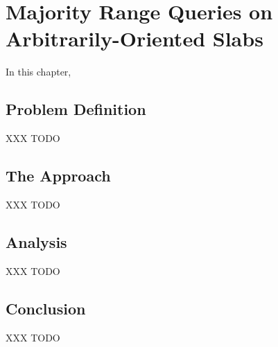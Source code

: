 \chapter{Majority Range Queries on Arbitrarily-Oriented Slabs}
\label{:slabs}

In this chapter, 


\section{Problem Definition}
\label{:slabs:problem-definition}

XXX TODO

\section{The Approach}
\label{:slabs:approach}


XXX TODO

\section{Analysis}
\label{:slabs:analysis}

XXX TODO

\section{Conclusion}
\label{:slabs:concl}

XXX TODO
